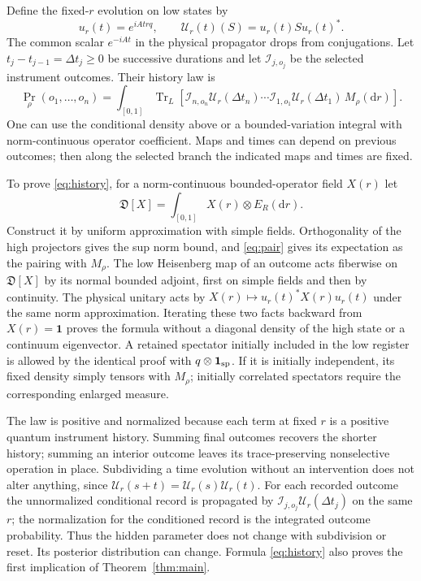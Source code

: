 \documentclass[11pt]{article}
\newcommand{\cI}{\mathcal I}
\newcommand{\cU}{\mathcal U}
\newcommand{\tr}{\operatorname{Tr}}
\newcommand{\dd}{\mathrm d}
\newcommand{\one}{\mathbf 1}
\begin{document}
Define the fixed-\(r\) evolution on low states by
\begin{equation}
 u_r(t)=e^{iAtrq},\qquad \cU_r(t)(S)=u_r(t)S u_r(t)^*.
 \label{eq:fiber}
\end{equation}
The common scalar \(e^{-iAt}\) in the physical propagator drops from conjugations. Let \(t_j-t_{j-1}=\Delta t_j\geq 0\) be successive durations and let \(\cI_{j,o_j}\) be the selected instrument outcomes. Their history law is
\begin{equation}
 \Pr_\rho(o_1,\ldots,o_n)
 =\int_{[0,1]}\!\!
 \tr_L\!\left[
 \cI_{n,o_n}\cU_r(\Delta t_n)\cdots
 \cI_{1,o_1}\cU_r(\Delta t_1)\,M_\rho(\dd r)
 \right].
 \label{eq:history}
\end{equation}
One can use the conditional density above or a bounded-variation integral with norm-continuous operator coefficient. Maps and times can depend on previous outcomes; then along the selected branch the indicated maps and times are fixed.

To prove \eqref{eq:history}, for a norm-continuous bounded-operator field \(X(r)\) let
\[
 \mathfrak D[X]=\int_{[0,1]} X(r)\otimes E_R(\dd r).
\]
Construct it by uniform approximation with simple fields. Orthogonality of the high projectors gives the sup norm bound, and \eqref{eq:pair} gives its expectation as the pairing with \(M_\rho\). The low Heisenberg map of an outcome acts fiberwise on \(\mathfrak D[X]\) by its normal bounded adjoint, first on simple fields and then by continuity. The physical unitary acts by \(X(r)\mapsto u_r(t)^*X(r)u_r(t)\) under the same norm approximation. Iterating these two facts backward from \(X(r)=\one\) proves the formula without a diagonal density of the high state or a continuum eigenvector. A retained spectator initially included in the low register is allowed by the identical proof with \(q\otimes\one_{\rm sp}\). If it is initially independent, its fixed density simply tensors with \(M_\rho\); initially correlated spectators require the corresponding enlarged measure.

The law is positive and normalized because each term at fixed \(r\) is a positive quantum instrument history. Summing final outcomes recovers the shorter history; summing an interior outcome leaves its trace-preserving nonselective operation in place. Subdividing a time evolution without an intervention does not alter anything, since \(\cU_r(s+t)=\cU_r(s)\cU_r(t)\). For each recorded outcome the unnormalized conditional record is propagated by \(\cI_{j,o_j}\cU_r(\Delta t_j)\) on the same \(r\); the normalization for the conditioned record is the integrated outcome probability. Thus the hidden parameter does not change with subdivision or reset. Its posterior distribution can change. Formula \eqref{eq:history} also proves the first implication of Theorem~\ref{thm:main}.
\end{document}
